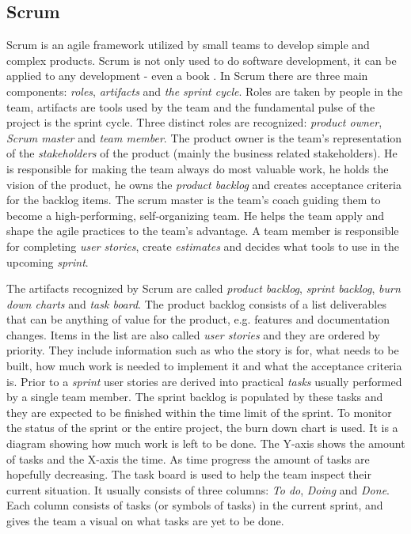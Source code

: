 \subsection{Scrum}

Scrum is an agile framework utilized by small teams to develop simple and
complex products. Scrum is not only used to do software development, it can be
applied to any development - even a book \cite{sims2012scrum}. In Scrum there
are three main components: \textit{roles}, \textit{artifacts} and \textit{the
sprint cycle}. Roles are taken by people in the team, artifacts are tools used
by the team and the fundamental pulse of the project is the sprint cycle. Three
distinct roles are recognized: \textit{product owner}, \textit{Scrum master}
and \textit{team member}. The product owner is the team's representation of the
\textit{stakeholders} of the product (mainly the business related
stakeholders). He is responsible for making the team always do most valuable
work, he holds the vision of the product, he owns the \textit{product backlog}
and creates acceptance criteria for the backlog items. The scrum master is the
team's coach guiding them to become a high-performing, self-organizing team. He
helps the team apply and shape the agile practices to the team's advantage. A
team member is responsible for completing \textit{user stories}, create
\textit{estimates} and decides what tools to use in the upcoming
\textit{sprint}. \cite{sims2012scrum}

The artifacts recognized by Scrum are called \textit{product backlog},
\textit{sprint backlog}, \textit{burn down charts} and \textit{task board}. The
product backlog consists of a list deliverables that can be anything of value
for the product, e.g. features and documentation changes. Items in the list are
also called \textit{user stories} and they are ordered by priority. They
include information such as who the story is for, what needs to be built, how
much work is needed to implement it and what the acceptance criteria is. Prior
to a \textit{sprint} user stories are derived into practical \textit{tasks}
usually performed by a single team member. The sprint backlog is populated by
these tasks and they are expected to be finished within the time limit of the
sprint. To monitor the status of the sprint or the entire project, the burn
down chart is used. It is a diagram showing how much work is left to be done.
The Y-axis shows the amount of tasks and the X-axis the time. As time progress
the amount of tasks are hopefully decreasing. The task board is used to help
the team inspect their current situation. It usually consists of three columns:
\textit{To do}, \textit{Doing} and \textit{Done}. Each column consists of tasks
(or symbols of tasks) in the current sprint, and gives the team a visual on
what tasks are yet to be done. \cite{sims2012scrum}

